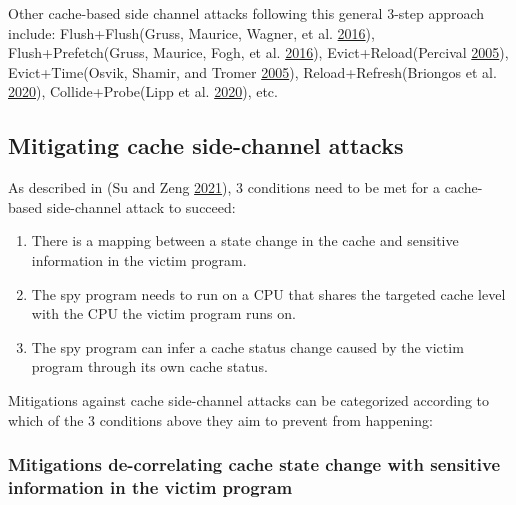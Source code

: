 \documentclass[a4paper,]{report}
\begin{document}
Other cache-based side channel attacks following this general 3-step
approach include: Flush+Flush(Gruss, Maurice, Wagner,
et al. \protect\hyperlink{ref-Gruss2016a}{2016}),
Flush+Prefetch(Gruss, Maurice, Fogh, et al.
\protect\hyperlink{ref-Gruss2016}{2016}),
Evict+Reload(Percival
\protect\hyperlink{ref-Percival2005}{2005}),
Evict+Time(Osvik, Shamir, and Tromer
\protect\hyperlink{ref-Osvik2005}{2005}),
Reload+Refresh(Briongos et al.
\protect\hyperlink{ref-Briongos2020}{2020}),
Collide+Probe(Lipp et al.
\protect\hyperlink{ref-Lipp2020}{2020}), etc.

\hypertarget{mitigating-cache-side-channel-attacks}{%
\subsection{Mitigating cache side-channel
attacks}\label{mitigating-cache-side-channel-attacks}}

As described in (Su and Zeng \protect\hyperlink{ref-Su2021}{2021}), 3
conditions need to be met for a cache-based side-channel attack to
succeed:

\begin{enumerate}
\def\labelenumi{\arabic{enumi}.}
\item
  There is a mapping between a state change in the cache and sensitive
  information in the victim program.
\item
  The spy program needs to run on a CPU that shares the targeted cache
  level with the CPU the victim program runs on.
\item
  The spy program can infer a cache status change caused by the victim
  program through its own cache status.
\end{enumerate}

Mitigations against cache side-channel attacks can be categorized
according to which of the 3 conditions above they aim to prevent from
happening:

\hypertarget{mitigations-de-correlating-cache-state-change-with-sensitive-information-in-the-victim-program}{%
\subsubsection{Mitigations de-correlating cache state change with
sensitive information in the victim
program}\label{mitigations-de-correlating-cache-state-change-with-sensitive-information-in-the-victim-program}}
\end{document}

